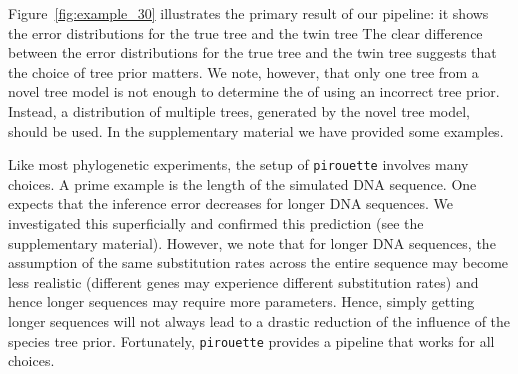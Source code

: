Figure~\ref{fig:example_30} illustrates the primary result of our pipeline: 
it shows the error distributions for the true tree and the twin tree  
The clear difference between the error distributions 
for the true tree and the twin tree suggests that the choice of tree prior matters.
We note, however, that only one tree from a novel tree model
is not enough to determine the  of using an incorrect
tree prior. Instead, a distribution 
of multiple trees, generated by the novel tree model, should be used. In the supplementary material we have provided some examples.

Like most phylogenetic experiments, the setup of \verb;pirouette;
involves many choices. A prime example is the length of the simulated DNA sequence. One expects that the inference error
decreases for longer DNA sequences. We investigated this superficially and confirmed this prediction (see the supplementary material). 
However, we note that for longer DNA sequences, the assumption 
of the same substitution rates across the entire sequence may become less realistic (different genes may experience different substitution rates)
and hence longer sequences may require more parameters. 
Hence, simply getting longer sequences will not always lead to a drastic 
reduction of the influence of the species tree prior.
Fortunately, \verb;pirouette; provides a pipeline that works for all choices.

